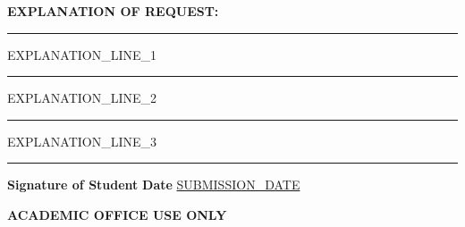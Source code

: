 \documentclass[11pt,letterpaper]{article}
\begin{document}
\vspace{0.15in}

\noindent
\textbf{EXPLANATION OF REQUEST:}

\noindent
\rule{\textwidth}{0.4pt}

\noindent
{{EXPLANATION_LINE_1}}

\noindent
\rule{\textwidth}{0.4pt}

\noindent
{{EXPLANATION_LINE_2}}

\noindent
\rule{\textwidth}{0.4pt}

\noindent
{{EXPLANATION_LINE_3}}

\noindent
\rule{\textwidth}{0.4pt}

\vspace{0.15in}

\noindent
\textbf{Signature of Student} \underline{\hspace{3in}} \textbf{Date} \underline{{{SUBMISSION_DATE}}\hspace{1in}}

\vspace{0.15in}

\noindent
\textbf{\large ACADEMIC OFFICE USE ONLY}

\vspace{0.1in}
\end{document}
